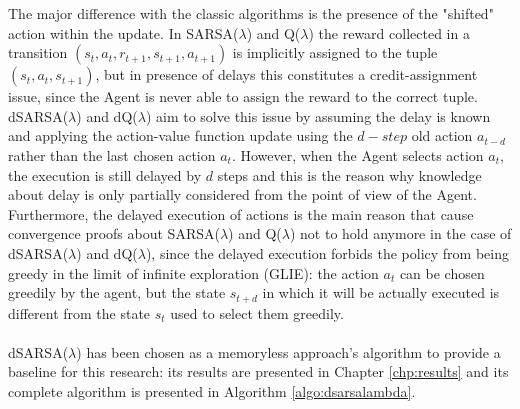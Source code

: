                 The major difference with the classic algorithms is the presence of the "shifted" action within the update. In SARSA($\lambda$) and Q($\lambda$) the reward collected in a transition $(s_t, a_t, r_{t+1}, s_{t+1}, a_{t+1})$ is implicitly assigned to the tuple $(s_t, a_t, s_{t+1})$, but in presence of delays this constitutes a credit-assignment issue, since the Agent is never able to assign the reward to the correct tuple. dSARSA($\lambda$) and dQ($\lambda$) aim to solve this issue by assuming the delay is known and applying the action-value function update using the $d-step$ old action $a_{t-d}$ rather than the last chosen action $a_t$.\newline
                However, when the Agent selects action $a_t$, the execution is still delayed by $d$ steps and this is the reason why knowledge about delay is only partially considered from the point of view of the Agent. Furthermore, the delayed execution of actions is the main reason that cause convergence proofs about SARSA($\lambda$) and Q($\lambda$) not to hold anymore in the case of dSARSA($\lambda$) and dQ($\lambda$), since the delayed execution forbids the policy from being greedy in the limit of infinite exploration (GLIE): the action $a_t$ can be chosen greedily by the agent, but the state $s_{t+d}$ in which it will be actually executed is different from the state $s_t$ used to select them greedily. 
                \\\\
                dSARSA($\lambda$) has been chosen as a memoryless approach's algorithm to provide a baseline for this research: its results are presented in Chapter \ref{chp:results} and its complete algorithm is presented in Algorithm \ref{algo:dsarsalambda}.
                
